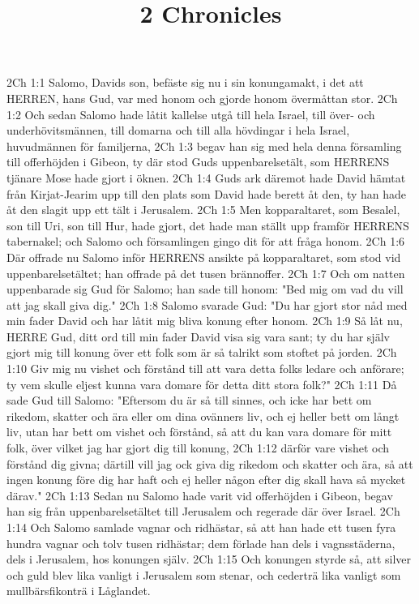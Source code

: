 

\title{2 Chronicles}

2Ch 1:1  Salomo, Davids son, befäste sig nu i sin konungamakt, i det att HERREN, hans Gud, var med honom och gjorde honom övermåttan stor.
2Ch 1:2  Och sedan Salomo hade låtit kallelse utgå till hela Israel, till över- och underhövitsmännen, till domarna och till alla hövdingar i hela Israel, huvudmännen för familjerna,
2Ch 1:3  begav han sig med hela denna församling till offerhöjden i Gibeon, ty där stod Guds uppenbarelsetält, som HERRENS tjänare Mose hade gjort i öknen.
2Ch 1:4  Guds ark däremot hade David hämtat från Kirjat-Jearim upp till den plats som David hade berett åt den, ty han hade åt den slagit upp ett tält i Jerusalem.
2Ch 1:5  Men kopparaltaret, som Besalel, son till Uri, son till Hur, hade gjort, det hade man ställt upp framför HERRENS tabernakel; och Salomo och församlingen gingo dit för att fråga honom.
2Ch 1:6  Där offrade nu Salomo inför HERRENS ansikte på kopparaltaret, som stod vid uppenbarelsetältet; han offrade på det tusen brännoffer.
2Ch 1:7  Och om natten uppenbarade sig Gud för Salomo; han sade till honom: "Bed mig om vad du vill att jag skall giva dig."
2Ch 1:8  Salomo svarade Gud: "Du har gjort stor nåd med min fader David och har låtit mig bliva konung efter honom.
2Ch 1:9  Så låt nu, HERRE Gud, ditt ord till min fader David visa sig vara sant; ty du har själv gjort mig till konung över ett folk som är så talrikt som stoftet på jorden.
2Ch 1:10  Giv mig nu vishet och förstånd till att vara detta folks ledare och anförare; ty vem skulle eljest kunna vara domare för detta ditt stora folk?"
2Ch 1:11  Då sade Gud till Salomo: "Eftersom du är så till sinnes, och icke har bett om rikedom, skatter och ära eller om dina ovänners liv, och ej heller bett om långt liv, utan har bett om vishet och förstånd, så att du kan vara domare för mitt folk, över vilket jag har gjort dig till konung,
2Ch 1:12  därför vare vishet och förstånd dig givna; därtill vill jag ock giva dig rikedom och skatter och ära, så att ingen konung före dig har haft och ej heller någon efter dig skall hava så mycket därav."
2Ch 1:13  Sedan nu Salomo hade varit vid offerhöjden i Gibeon, begav han sig från uppenbarelsetältet till Jerusalem och regerade där över Israel.
2Ch 1:14  Och Salomo samlade vagnar och ridhästar, så att han hade ett tusen fyra hundra vagnar och tolv tusen ridhästar; dem förlade han dels i vagnsstäderna, dels i Jerusalem, hos konungen själv.
2Ch 1:15  Och konungen styrde så, att silver och guld blev lika vanligt i Jerusalem som stenar, och cederträ lika vanligt som mullbärsfikonträ i Låglandet.
